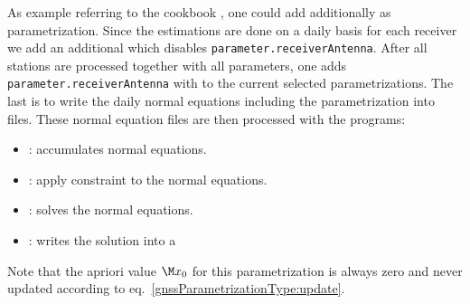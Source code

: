 As example referring to the cookbook ,
one could add additionally  as parametrization.
Since the estimations are done on a daily basis for each receiver we add an additional
 which
disables \verb|parameter.receiverAntenna|. After all stations are processed together with all parameters, one
adds \verb|parameter.receiverAntenna| with 
 to the current selected parametrizations.
The last  is 
to write the daily normal equations including the parametrization  into files.
These normal equation files are then processed with the programs:

\begin{itemize}
  \item {}: accumulates normal equations.
  \item {}: apply constraint to the normal equations.
  \item {}: solves the normal equations.
  \item {}: writes the solution into a 
\end{itemize}

Note that the apriori value $\M x_0$ for this parametrization is always zero and never updated
according to eq.~\eqref{gnssParametrizationType:update}.


